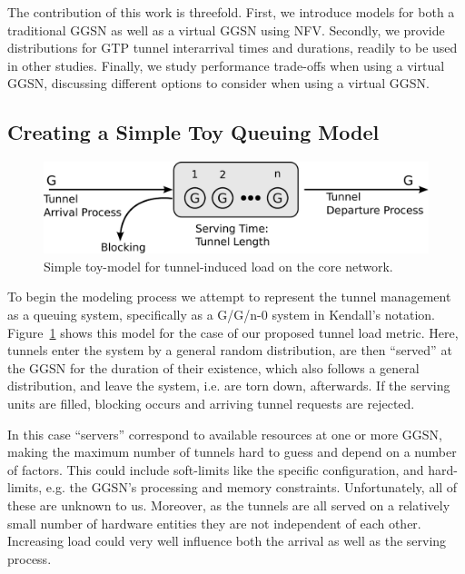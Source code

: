 The contribution of this work is threefold. First, we introduce models for both a traditional \gls{GGSN} as well as a virtual \gls{GGSN} using \gls{NFV}. Secondly, we provide distributions for \gls{GTP} tunnel interarrival times and durations, readily to be used in other studies. Finally, we study performance trade-offs when using a virtual \gls{GGSN}, discussing different options to consider when using a virtual \gls{GGSN}.


\subsection{Creating a Simple Toy Queuing Model}

\begin{figure}[htbp]
	\centering
	\includegraphics[width=\columnwidth]{images/GGn-model.pdf}
	\caption{Simple toy-model for tunnel-induced load on the core network.}
	\label{c4:fig:ggn-model}
\end{figure}

To begin the modeling process we attempt to represent the tunnel management as a queuing system, specifically as a G/G/n-0 system in Kendall's notation. Figure~\ref{c4:fig:ggn-model} shows this model for the case of our proposed tunnel load metric. Here, tunnels enter the system by a general random distribution, are then ``served'' at the \gls{GGSN} for the duration of their existence, which also follows a general distribution, and leave the system, i.e. are torn down, afterwards. If the serving units are filled, blocking occurs and arriving tunnel requests are rejected.

In this case ``servers'' correspond to available resources at one or more \gls{GGSN}, making the maximum number of tunnels hard to guess and depend on a number of factors. This could include soft-limits like the specific configuration, and hard-limits, e.g. the \gls{GGSN}'s processing and memory constraints. Unfortunately, all of these are unknown to us. Moreover, as the tunnels are all served on a relatively small number of hardware entities they are not independent of each other. Increasing load could very well influence both the arrival as well as the serving process.

